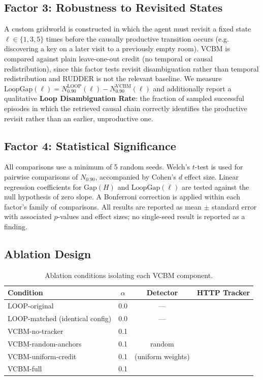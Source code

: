 \documentclass[11pt]{article}
\newcommand{\cmark}{\ding{51}}
\newcommand{\xmark}{\ding{55}}
\begin{document}
\subsection{Factor 3: Robustness to Revisited States}

A custom gridworld is constructed in which the agent must revisit a fixed
state $\ell \in \{1,3,5\}$ times before the causally productive transition
occurs (e.g. discovering a key on a later visit to a previously empty room).
VCBM is compared against plain leave-one-out credit (no temporal or causal
redistribution), since this factor tests revisit disambiguation rather than
temporal redistribution and RUDDER is not the relevant baseline. We measure
$\mathrm{LoopGap}(\ell) = N_{0.90}^{\mathrm{LOOP}}(\ell) - N_{0.90}^{\mathrm{VCBM}}(\ell)$
and additionally report a qualitative
\textbf{Loop Disambiguation Rate}: the fraction of sampled successful episodes
in which the retrieved causal chain correctly identifies the productive
revisit rather than an earlier, unproductive one.

\subsection{Factor 4: Statistical Significance}

All comparisons use a minimum of 5 random seeds. Welch's $t$-test is used for
pairwise comparisons of $N_{0.90}$, accompanied by Cohen's $d$ effect size.
Linear regression coefficients for $\mathrm{Gap}(H)$ and $\mathrm{LoopGap}(\ell)$
are tested against the null hypothesis of zero slope. A Bonferroni correction
is applied within each factor's family of comparisons. All results are
reported as mean $\pm$ standard error with associated $p$-values and effect
sizes; no single-seed result is reported as a finding.

\subsection{Ablation Design}

\begin{table}[h]
\centering
\caption{Ablation conditions isolating each VCBM component.}
\begin{tabular}{@{}lccc@{}}
\toprule
Condition & $\alpha$ & Detector & HTTP Tracker \\
\midrule
LOOP-original & 0.0 & --- & \xmark \\
LOOP-matched (identical config) & 0.0 & --- & \xmark \\
VCBM-no-tracker & 0.1 & \cmark & \xmark \\
VCBM-random-anchors & 0.1 & random & \cmark \\
VCBM-uniform-credit & 0.1 & \cmark (uniform weights) & \cmark \\
VCBM-full & 0.1 & \cmark & \cmark \\
\bottomrule
\end{tabular}
\end{table}
\end{document}
